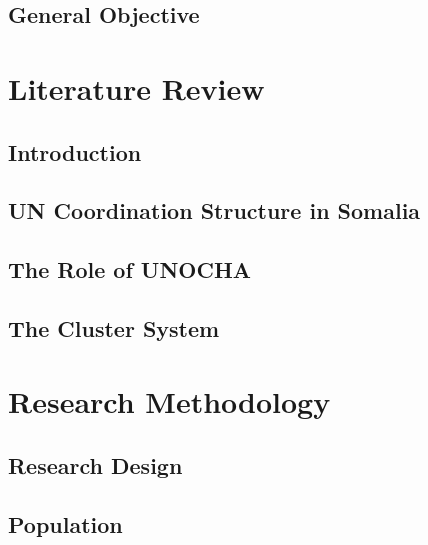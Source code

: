 \documentclass[
]{book}
\begin{document}
\hypertarget{general-objective}{%
\section{General Objective}\label{general-objective}}

\hypertarget{literature-review}{%
\chapter{Literature Review}\label{literature-review}}

\hypertarget{introduction-1}{%
\section{Introduction}\label{introduction-1}}

\hypertarget{un-coordination-structure-in-somalia}{%
\section{UN Coordination Structure in Somalia}\label{un-coordination-structure-in-somalia}}

\hypertarget{the-role-of-unocha}{%
\section{The Role of UNOCHA}\label{the-role-of-unocha}}

\hypertarget{the-cluster-system}{%
\section{The Cluster System}\label{the-cluster-system}}

\hypertarget{research-methodology}{%
\chapter{Research Methodology}\label{research-methodology}}

\hypertarget{research-design}{%
\section{Research Design}\label{research-design}}

\hypertarget{population}{%
\section{Population}\label{population}}
\end{document}
